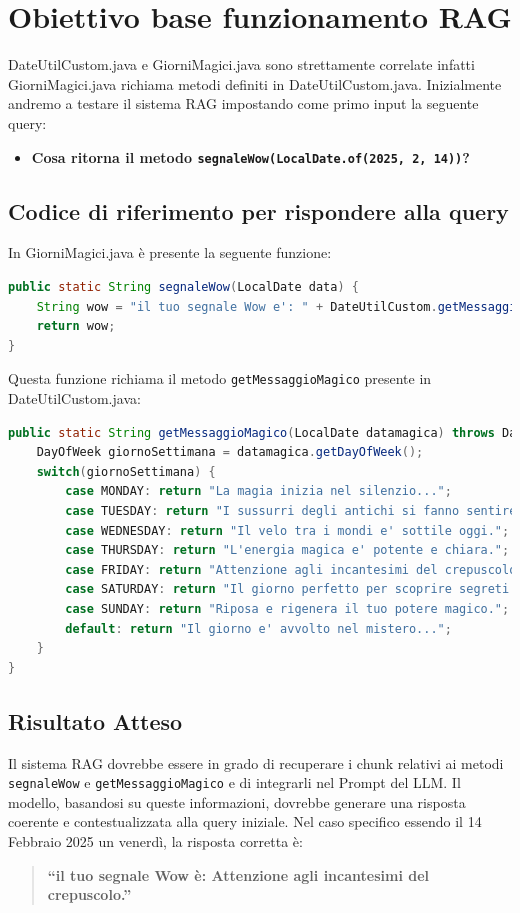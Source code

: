\documentclass[12pt,a4paper,openright,twoside]{book}
\begin{document}
\section{Obiettivo base funzionamento RAG}
DateUtilCustom.java e GiorniMagici.java sono strettamente correlate infatti GiorniMagici.java richiama metodi definiti in DateUtilCustom.java.
Inizialmente andremo a testare il sistema RAG impostando come primo input la seguente query: 
\begin{itemize}
    \item \textbf{Cosa ritorna il metodo \texttt{segnaleWow(LocalDate.of(2025, 2, 14))}?}
\end{itemize}

\subsection{Codice di riferimento per rispondere alla query}
In GiorniMagici.java è presente la seguente funzione:
\begin{lstlisting}[language=Java, caption={Metodo segnaleWow in GiorniMagici.java}, label={lst:segnaleWow}]
public static String segnaleWow(LocalDate data) {
    String wow = "il tuo segnale Wow e': " + DateUtilCustom.getMessaggioMagico(data);
    return wow;
}
\end{lstlisting}
Questa funzione richiama il metodo \texttt{getMessaggioMagico} presente in DateUtilCustom.java:

\begin{lstlisting}[language=Java, caption={Metodo getMessaggioMagico in DateUtilCustom.java}, label={lst:getMessaggioMagico}]
public static String getMessaggioMagico(LocalDate datamagica) throws DateTimeParseException {
    DayOfWeek giornoSettimana = datamagica.getDayOfWeek();
    switch(giornoSettimana) {
        case MONDAY: return "La magia inizia nel silenzio...";
        case TUESDAY: return "I sussurri degli antichi si fanno sentire.";
        case WEDNESDAY: return "Il velo tra i mondi e' sottile oggi.";
        case THURSDAY: return "L'energia magica e' potente e chiara.";
        case FRIDAY: return "Attenzione agli incantesimi del crepuscolo.";
        case SATURDAY: return "Il giorno perfetto per scoprire segreti nascosti.";
        case SUNDAY: return "Riposa e rigenera il tuo potere magico.";
        default: return "Il giorno e' avvolto nel mistero...";
    }
}
\end{lstlisting}

\subsection{Risultato Atteso}
Il sistema RAG dovrebbe essere in grado di recuperare i chunk relativi ai metodi \texttt{segnaleWow} e \texttt{getMessaggioMagico} e di integrarli nel Prompt del LLM.
Il modello, basandosi su queste informazioni, dovrebbe generare una risposta coerente e contestualizzata alla query iniziale.
Nel caso specifico essendo il 14 Febbraio 2025 un venerdì,  la risposta corretta è:
\begin{quote}
    \textbf{``il tuo segnale Wow è: Attenzione agli incantesimi del crepuscolo.''}
\end{quote}
\end{document}
